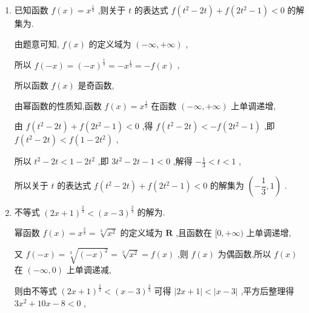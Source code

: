 \begin{enumerate}
\begin{jieda}
        当 $m = 2$ 时, $f\left( x\right)  = {x}^{2}$ ,其图象关于 $y$ 轴对称,
        
        当 $m = 3$ 时, $f\left( x\right)  = {x}^{3}$ ,其图象关于(0,0)对称,
        
        因此 $m = 2$
    \end{jieda} 
    \item 已知函数 $f\left( x\right)  = {x}^{\frac{1}{3}}$ ,则关于 $t$ 的表达式 $f\left( {{t}^{2} - {2t}}\right)  + f\left( {2{t}^{2} - 1}\right)  < 0$ 的解集为.
    \begin{jieda}
        由题意可知, $f\left( x\right)$ 的定义域为 $\left( {-\infty , + \infty }\right)$ ,
        
        所以 $f\left( {-x}\right)  = {\left( -x\right) }^{\frac{1}{3}} =  - {x}^{\frac{1}{3}} =  - f\left( x\right)$ ,
        
        所以函数 $f\left( x\right)$ 是奇函数,
        
        由幂函数的性质知,函数 $f\left( x\right)  = {x}^{\frac{1}{3}}$ 在函数 $\left( {-\infty , + \infty }\right)$ 上单调递增,
        
        由 $f\left( {{t}^{2} - {2t}}\right)  + f\left( {2{t}^{2} - 1}\right)  < 0$ ,得 $f\left( {{t}^{2} - {2t}}\right)  <  - f\left( {2{t}^{2} - 1}\right)$ ,即 $f\left( {{t}^{2} - {2t}}\right)  < f\left( {1 - 2{t}^{2}}\right)$ ,
        
        所以 ${t}^{2} - {2t} < 1 - 2{t}^{2}$ ,即 $3{t}^{2} - {2t} - 1 < 0$ ,解得 $- \frac{1}{3} < t < 1$ ,
        
        所以关于 $t$ 的表达式 $f\left( {{t}^{2} - {2t}}\right)  + f\left( {2{t}^{2} - 1}\right)  < 0$ 的解集为 $\left( {-\dfrac{1}{3},1}\right)$ .
    \end{jieda}
    \item 不等式 ${\left( 2x + 1\right) }^{\frac{2}{3}} < {\left( x - 3\right) }^{\frac{2}{3}}$ 的解为.
    \begin{jieda}
        幂函数 $f\left( x\right)  = {x}^{\frac{2}{3}} = \sqrt[3]{{x}^{2}}$ 的定义域为 $\mathbf{R}$ ,且函数在 $\lbrack 0, + \infty )$ 上单调递增,
        
        又 $f\left( {-x}\right)  = \sqrt[3]{{\left( -x\right) }^{2}} = \sqrt[3]{{x}^{2}} = f\left( x\right)$ ,则 $f\left( x\right)$ 为偶函数,所以 $f\left( x\right)$ 在 $\left( {-\infty ,0}\right)$ 上单调递减,
        
        则由不等式 ${\left( 2x + 1\right) }^{\frac{2}{3}} < {\left( x - 3\right) }^{\frac{2}{3}}$ 可得 $\left| {{2x} + 1}\right|  < \left| {x - 3}\right|$ ,平方后整理得 $3{x}^{2} + {10x} - 8 < 0$ ,
        

\end{jieda}
\end{enumerate}
